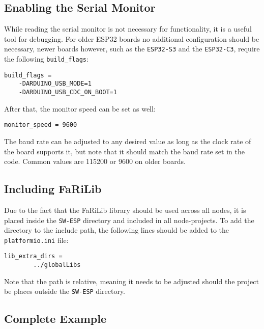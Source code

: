     \subsection{Enabling the Serial Monitor}
    While reading the serial monitor is not necessary for functionality, it is a
    useful tool for debugging. For older ESP32 boards no additional configuration 
    should be necessary, newer boards however, such as the \texttt{ESP32-S3} and the 
    \texttt{ESP32-C3}, require the following \texttt{build\_flags}: 
    \begin{lstlisting}[style=cppCode]
    build_flags =
    -DARDUINO_USB_MODE=1
    -DARDUINO_USB_CDC_ON_BOOT=1
    \end{lstlisting}
    After that, the monitor speed can be set as well:
    \begin{lstlisting}[style=cppCode]
    monitor_speed = 9600
    \end{lstlisting}
    The baud rate can be adjusted to any desired value as long as the clock rate
    of the board supports it, but note that it should match the baud rate set in 
    the code. Common values are 115200 or 9600 on older boards.

    \subsection{Including FaRiLib} \label{sec:farilib_include}
    Due to the fact that the FaRiLib library should be used across all nodes, it is
    placed inside the \texttt{SW-ESP} directory and included in all node-projects.
    To add the directory to the include path, the following lines should be added to
    the \texttt{platformio.ini} file:
    \begin{lstlisting}[style=cppCode]
    lib_extra_dirs =
        ../globalLibs
    \end{lstlisting}
    Note that the path is relative, meaning it needs to be adjusted should the project
    be places outside the \texttt{SW-ESP} directory.

    \subsection{Complete Example}